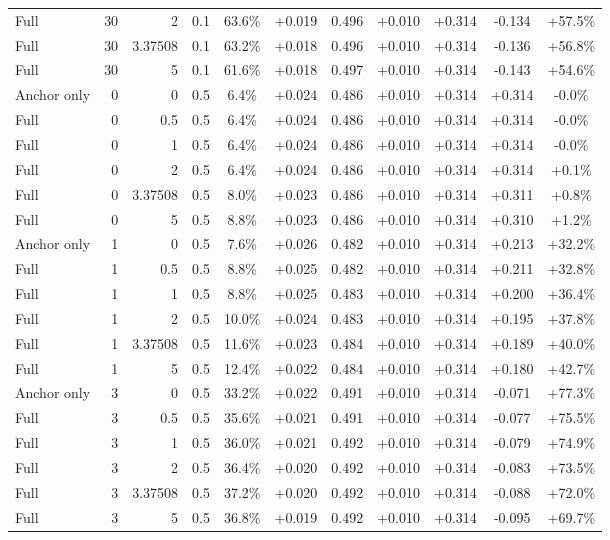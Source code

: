 \begin{table}[htbp]
\begin{tabular}{lrrrccccccc}
Full & 30 & 2 & 0.1 & 63.6\% & +0.019 & 0.496 & +0.010 & +0.314 & -0.134 & +57.5\% \\
Full & 30 & 3.37508 & 0.1 & 63.2\% & +0.018 & 0.496 & +0.010 & +0.314 & -0.136 & +56.8\% \\
Full & 30 & 5 & 0.1 & 61.6\% & +0.018 & 0.497 & +0.010 & +0.314 & -0.143 & +54.6\% \\
Anchor only & 0 & 0 & 0.5 & 6.4\% & +0.024 & 0.486 & +0.010 & +0.314 & +0.314 & -0.0\% \\
Full & 0 & 0.5 & 0.5 & 6.4\% & +0.024 & 0.486 & +0.010 & +0.314 & +0.314 & -0.0\% \\
Full & 0 & 1 & 0.5 & 6.4\% & +0.024 & 0.486 & +0.010 & +0.314 & +0.314 & -0.0\% \\
Full & 0 & 2 & 0.5 & 6.4\% & +0.024 & 0.486 & +0.010 & +0.314 & +0.314 & +0.1\% \\
Full & 0 & 3.37508 & 0.5 & 8.0\% & +0.023 & 0.486 & +0.010 & +0.314 & +0.311 & +0.8\% \\
Full & 0 & 5 & 0.5 & 8.8\% & +0.023 & 0.486 & +0.010 & +0.314 & +0.310 & +1.2\% \\
Anchor only & 1 & 0 & 0.5 & 7.6\% & +0.026 & 0.482 & +0.010 & +0.314 & +0.213 & +32.2\% \\
Full & 1 & 0.5 & 0.5 & 8.8\% & +0.025 & 0.482 & +0.010 & +0.314 & +0.211 & +32.8\% \\
Full & 1 & 1 & 0.5 & 8.8\% & +0.025 & 0.483 & +0.010 & +0.314 & +0.200 & +36.4\% \\
Full & 1 & 2 & 0.5 & 10.0\% & +0.024 & 0.483 & +0.010 & +0.314 & +0.195 & +37.8\% \\
Full & 1 & 3.37508 & 0.5 & 11.6\% & +0.023 & 0.484 & +0.010 & +0.314 & +0.189 & +40.0\% \\
Full & 1 & 5 & 0.5 & 12.4\% & +0.022 & 0.484 & +0.010 & +0.314 & +0.180 & +42.7\% \\
Anchor only & 3 & 0 & 0.5 & 33.2\% & +0.022 & 0.491 & +0.010 & +0.314 & -0.071 & +77.3\% \\
Full & 3 & 0.5 & 0.5 & 35.6\% & +0.021 & 0.491 & +0.010 & +0.314 & -0.077 & +75.5\% \\
Full & 3 & 1 & 0.5 & 36.0\% & +0.021 & 0.492 & +0.010 & +0.314 & -0.079 & +74.9\% \\
Full & 3 & 2 & 0.5 & 36.4\% & +0.020 & 0.492 & +0.010 & +0.314 & -0.083 & +73.5\% \\
Full & 3 & 3.37508 & 0.5 & 37.2\% & +0.020 & 0.492 & +0.010 & +0.314 & -0.088 & +72.0\% \\
Full & 3 & 5 & 0.5 & 36.8\% & +0.019 & 0.492 & +0.010 & +0.314 & -0.095 & +69.7\% \\

\end{tabular}
\end{table}
